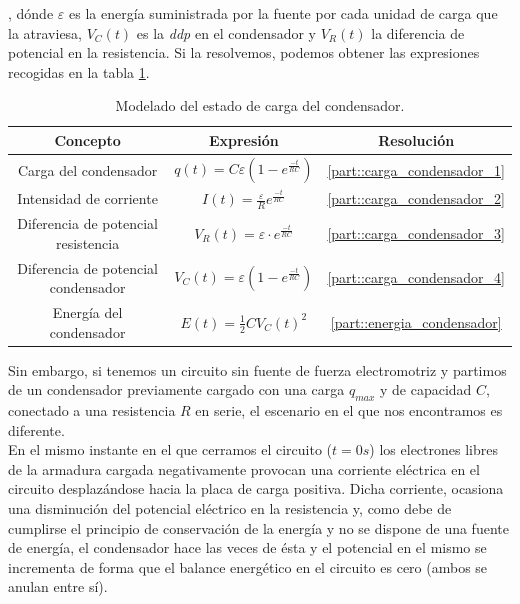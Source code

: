 \documentclass[../main.tex]{subfiles}
\begin{document}
, dónde $\varepsilon$ es la energía suministrada por la fuente por cada unidad de carga que la atraviesa, $V_C(t)$ es la \textit{ddp} en el condensador y $V_R(t)$ la diferencia de potencial en la resistencia. Si la resolvemos, podemos obtener las expresiones recogidas en la tabla \ref{tab::ecuaciones_carga_rc}.\\


\begin{table}[!ht]
    \begin{center}
        \begin{tabular}{|| c | c | c ||}
            \hline
            \textbf{Concepto} & \textbf{Expresión} &  \textbf{Resolución}\\ \hline
            Carga del condensador & $q(t) = C\varepsilon \left( 1 - e^{\frac{-t}{RC}} \right)$ & \ref{part::carga_condensador_1} \\
            Intensidad de corriente & $I(t) = \frac{\varepsilon}{R}e^{\frac{-t}{RC}}$ & \ref{part::carga_condensador_2} \\
            Diferencia de potencial resistencia & $V_R(t) = \varepsilon \cdot e^{\frac{-t}{RC}}$ & \ref{part::carga_condensador_3} \\ 
            Diferencia de potencial condensador & $V_C(t) = \varepsilon \left(1- e^{\frac{-t}{RC}}\right)$ & \ref{part::carga_condensador_4} \\ 
            Energía del condensador & $E(t) = \frac{1}{2}CV_C(t)^2 $ & \ref{part::energia_condensador}
            \\
            \hline
            \end{tabular}
            \caption{Modelado del estado de carga del condensador.}
            \label{tab::ecuaciones_carga_rc}
    \end{center}
\end{table}

Sin embargo, si tenemos un circuito sin fuente de fuerza electromotriz y partimos de un condensador previamente cargado con una carga $q_{max}$ y de capacidad $C$, conectado a una resistencia $R$ en serie, el escenario en el que nos encontramos es diferente.\\ 

En el mismo instante en el que cerramos el circuito ($t=0s$) los electrones libres de la armadura cargada negativamente provocan una corriente eléctrica en el circuito desplazándose hacia la placa de carga positiva. Dicha corriente, ocasiona una disminución del potencial eléctrico en la resistencia y, como debe de cumplirse el principio de conservación de la energía y no se dispone de una fuente de energía, el condensador hace las veces de ésta y el potencial en el mismo se incrementa de forma que el balance energético en el circuito es cero (ambos se anulan entre sí). \\
\end{document}
